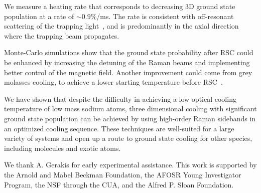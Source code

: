 \documentclass[aps,prl,twocolumn,groupedaddress]{revtex4-1}
\begin{document}
We measure a heating rate that corresponds to decreasing 3D ground state population
at a rate of $\sim0.9$\%/ms.
The rate is consistent with off-resonant scattering of the trapping light~\cite{Grimm2000},
and is predominantly in the axial direction where the trapping beam propagates.

Monte-Carlo simulations show that the ground state probability after RSC
could be enhanced by increasing the detuning of the Raman beams and implementing
better control of the magnetic field. Another improvement could come from
grey molasses cooling, to achieve a lower starting temperature before RSC~\cite{Colzi2016}.

We have shown that despite the difficulty in achieving a low optical cooling temperature
of low mass sodium atoms, three dimensional cooling
with significant ground state population can be achieved by using high-order Raman sidebands
in an optimized cooling sequence.
These techniques are well-suited for a large variety of systems
and open up a route to ground state cooling for other species,
including molecules and exotic atoms.

We thank A. Gerakis for early experimental assistance.
This work is supported by the Arnold and Mabel Beckman Foundation,
the AFOSR Young Investigator Program, the NSF through the CUA,
and the Alfred P. Sloan Foundation.


\end{document}
